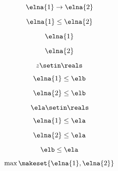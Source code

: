 {\begin{forslides}
    \begin{equation}
        \label{eq:parallelism-132}
        \elna{1}\to \elna{2}
    \end{equation}

    \begin{equation}
        \label{eq:parallelism-133}
        \elna{1}\leq \elna{2}
    \end{equation}

    \begin{equation}
        \label{eq:parallelism-134}
        \elna{1}
    \end{equation}

    \begin{equation}
        \label{eq:parallelism-135}
        \elna{2}
    \end{equation}

    \begin{equation}
        \label{eq:parallelism-136}
        z\setin \reals
    \end{equation}

    \begin{equation}
        \label{eq:parallelism-137}
        \elna{1}\leq \elb
    \end{equation}

    \begin{equation}
        \label{eq:parallelism-138}
        \elna{2}\leq \elb
    \end{equation}

    \begin{equation}
        \label{eq:parallelism-139}
        \ela\setin \reals
    \end{equation}

    \begin{equation}
        \label{eq:parallelism-140}
        \elna{1}\leq \ela
    \end{equation}

    \begin{equation}
        \label{eq:parallelism-141}
        \elna{2}\leq \ela
    \end{equation}

    \begin{equation}
        \label{eq:parallelism-142}
        \elb\leq \ela
    \end{equation}

    \begin{equation}
        \label{eq:parallelism-143}
        \max\makeset{\elna{1},\elna{2}}
    \end{equation}


\end{forslides}}
